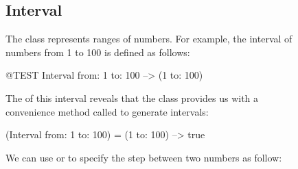 \documentclass[a4paper,10pt,twoside]{book}
\begin{document}
\begin{figure}
\begin{center}





\subsection{Interval}
The class  represents ranges of numbers.
For example, the interval of numbers from 1 to 100 is defined as follows:
\begin{code}{@TEST}
Interval from: 1 to: 100 --> (1 to: 100)
\end{code}

\noindent
The  of this interval reveals that the class  provides us with a convenience method called  to generate intervals:

\begin{code}{}
(Interval from: 1 to: 100) = (1 to: 100) --> true
\end{code}

We can use  or  to specify the step between two numbers as follow:


\end{center}
\end{figure}
\end{document}
